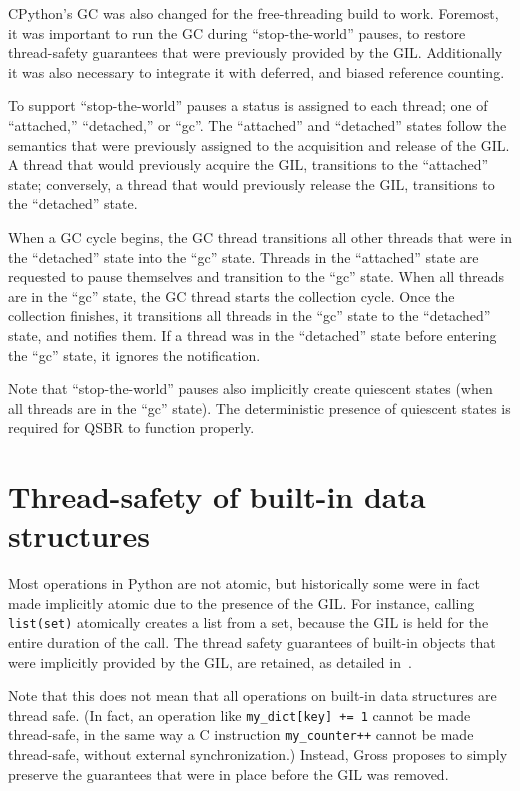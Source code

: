 CPython's GC was also changed for the free-threading build to work.
Foremost, it was important to run the GC during ``stop-the-world'' pauses, to restore thread-safety guarantees that were previously provided by the GIL\@.
Additionally it was also necessary to integrate it with deferred, and biased reference counting.

To support ``stop-the-world'' pauses a status is assigned to each thread; one of ``attached,'' ``detached,'' or ``gc''.
The ``attached'' and ``detached'' states follow the semantics that were previously assigned to the acquisition and release of the GIL\@.
A thread that would previously acquire the GIL, transitions to the ``attached'' state; conversely, a thread that would previously release the GIL, transitions to the ``detached'' state.

When a GC cycle begins, the GC thread transitions all other threads that were in the ``detached'' state into the ``gc'' state.
Threads in the ``attached'' state are requested to pause themselves and transition to the ``gc'' state.
When all threads are in the ``gc'' state, the GC thread starts the collection cycle.
Once the collection finishes, it transitions all threads in the ``gc'' state to the ``detached'' state, and notifies them.
If a thread was in the ``detached'' state before entering the ``gc'' state, it ignores the notification.

Note that ``stop-the-world'' pauses also implicitly create quiescent states (when all threads are in the ``gc'' state).
The deterministic presence of quiescent states is required for QSBR to function properly.


\section{Thread-safety of built-in data structures}\label{sec:thread-safety-of-builtin-data-structures}

Most operations in Python are not atomic, but historically some were in fact made implicitly atomic due to the presence of the GIL\@.
For instance, calling \texttt{{list(set)}} atomically creates a list from a set, because the GIL is held for the entire duration of the call.
The thread safety guarantees of built-in objects that were implicitly provided by the GIL, are retained, as detailed in~\cite[\S Container Thread-Safety]{pep703}.

Note that this does not mean that all operations on built-in data structures are thread safe.
(In fact, an operation like \texttt{{my\_dict[key] += 1}} cannot be made thread-safe, in the same way a C instruction \texttt{{my\_counter++}} cannot be made thread-safe, without external synchronization.)
Instead, Gross proposes to simply preserve the guarantees that were in place before the GIL was removed.

